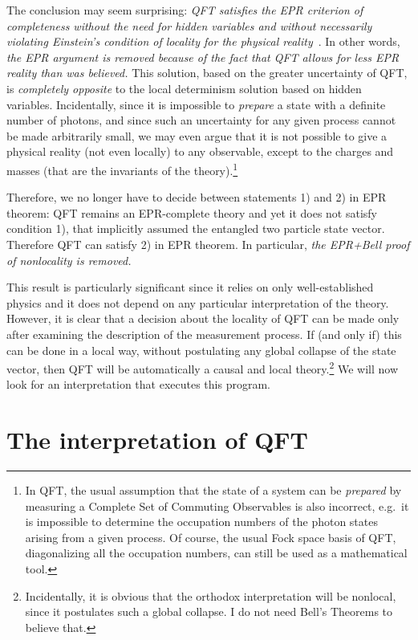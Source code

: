 \documentclass[12pt]{article}
\begin{document}
The conclusion may seem surprising: \emph{QFT satisfies the EPR
criterion of completeness without the need for hidden variables and
without necessarily violating Einstein's condition of locality for the
physical reality}~\cite{pureprp}. In other words, \emph{the EPR
argument is removed because of the fact that QFT allows for less EPR
reality than was believed.} This solution, based on the greater
uncertainty of QFT, is \emph{completely opposite} to the local
determinism solution based on hidden variables.  Incidentally, since
it is impossible to \emph{prepare} a state with a definite number of
photons, and since such an uncertainty for any given process cannot be
made arbitrarily small, we may even argue that it is not possible to
give a physical reality (not even locally) to any observable, except
to the charges and masses (that are the invariants of the
theory).\footnote{In QFT, the usual assumption that the state of a
system can be \emph{prepared} by measuring a Complete Set of Commuting
Observables is also incorrect, e.g.\ it is impossible to determine the
occupation numbers of the photon states arising from a given
process. Of course, the usual Fock space basis of QFT, diagonalizing
all the occupation numbers, can still be used as a mathematical tool.}

Therefore, we no longer have to decide between statements 1) and 2) in
EPR theorem: QFT remains an EPR-complete theory and yet it does not
satisfy condition 1), that implicitly assumed the entangled two
particle state vector. Therefore QFT can satisfy 2) in EPR theorem. In
particular, \emph{the EPR+Bell proof of nonlocality is removed.}

This result is particularly significant since it relies on only
well-established physics and it does not depend on any particular
interpretation of the theory. However, it is clear that a decision
about the locality of QFT can be made only after examining the
description of the measurement process. If (and only if) this can be
done in a local way, without postulating any global collapse of the
state vector, then QFT will be automatically a causal and local
theory.\footnote{Incidentally, it is obvious that the orthodox
interpretation will be nonlocal, since it postulates such a global
collapse. I do not need Bell's Theorems to believe that.} We will now
look for an interpretation that executes this program.


\section{The interpretation of QFT}
\end{document}
